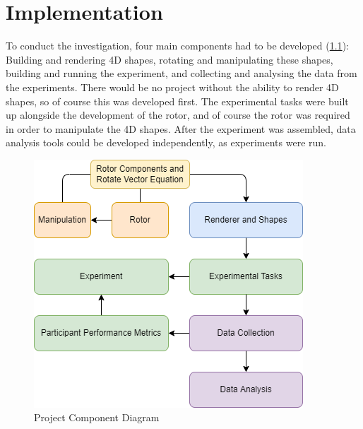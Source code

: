 \documentclass{l4proj}
\begin{document}
\chapter{Implementation}

\noindent
\begin{minipage}[c]{0.45\linewidth}
  To conduct the investigation, four main components had to be developed (\cref{fig:components}): Building and rendering 4D shapes, rotating and manipulating these shapes, building and running the experiment, and collecting and analysing the data from the experiments.
  There would be no project without the ability to render 4D shapes, so of course this was developed first. The experimental tasks were built up alongside the development of the rotor, and of course the rotor was required in order to manipulate the 4D shapes. After the experiment was assembled, data analysis tools could be developed independently, as experiments were run.
\end{minipage} 
\hspace{0.8cm}
\begin{minipage}[c]{0.4\linewidth}
  \begin{figure}[H]
    \centering
    \includegraphics[width=\textwidth]{images/Implementation Schema.drawio.png}
  \caption{Project Component Diagram}
  \label{fig:components}
  \end{figure}
\end{minipage}
\end{document}
